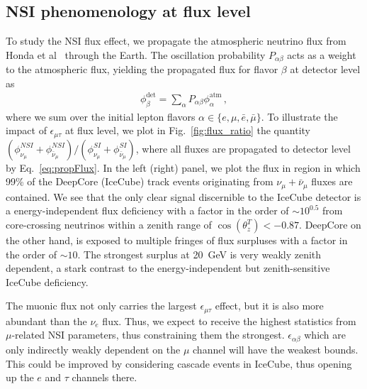 \documentclass[draft=True]{revtex4-2}
\newcommand{\ztrue}{\ensuremath{\cos{(\theta_z^{T})}}}
\newcommand{\emt}{\ensuremath{\epsilon_{\mu\tau}}}
\renewcommand{\ne}{\nu_e}
\newcommand{\nm}{\nu_\mu}
\newcommand{\anm}{\bar\nu_\mu}
\begin{document}
\subsection{NSI phenomenology at flux level}\label{sec:nsiFluxEffects}
To study the NSI flux effect, we propagate the atmospheric neutrino flux from Honda et al~\cite{hondapaper} through the Earth.
The oscillation probability $P_{\alpha \beta}$ acts as a weight to the atmospheric flux, yielding the propagated flux for flavor $\beta$ at detector level as 
\begin{align}\label{eq:propFlux}
    \phi_\beta^\text{det} = \sum_\alpha P_{\alpha\beta} \phi_\alpha^\text{atm} \,,
\end{align}
where we sum over the initial lepton flavors $\alpha \in \{e,\mu, \bar{e}, \bar{\mu}\}$.
To illustrate the impact of $\emt$ at flux level, 
we plot in Fig.~\ref{fig:flux_ratio} the quantity $(\phi_{\nu_\mu}^{NSI} + \phi_{\bar\nu_\mu}^{NSI})/(\phi_{\nu_\mu}^{SI} + \phi_{\bar\nu_\mu}^{SI})$, 
where all fluxes are propagated to detector level by Eq.~\ref{eq:propFlux}. 
In the left (right) panel, we plot the flux in region in which 99\% of the 
DeepCore (IceCube) track events originating from $\nm + \anm$ fluxes are contained. We see that the only clear signal discernible to the IceCube detector
is a energy-independent flux deficiency with a factor in the order of $\sim 10^{0.5}$ from core-crossing neutrinos within a zenith range of $\ztrue < -0.87$. DeepCore on the other hand, 
is exposed to multiple fringes of flux surpluses with a factor in the order of $\sim 10$. The strongest surplus at \SI{20}{\GeV} is very weakly zenith dependent, a stark contrast to the
energy-independent but zenith-sensitive IceCube deficiency.

The muonic flux not only carries the largest $\emt$ effect, but it is also more abundant than the $\ne$ flux. Thus, we expect to receive the highest statistics from $\mu$-related NSI parameters,
thus constraining them the strongest. $\epsilon_{\alpha\beta}$ which are only indirectly weakly dependent on the $\mu$ channel will have the weakest bounds. This could be improved
by considering cascade events in IceCube, thus opening up the $e$ and $\tau$ channels there.
\end{document}
